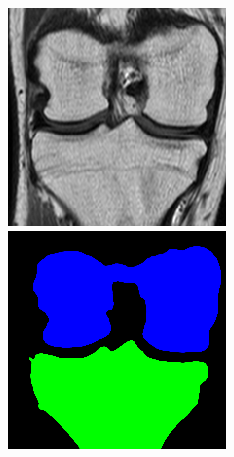 \begin{figure}[H]
\endminipage
\vspace{0.15cm}
  \includegraphics[width=\linewidth]{imgs/a3.png}
\endminipage\hfill
{}
  \includegraphics[width=\linewidth]{imgs/b3.png}

\end{figure}
